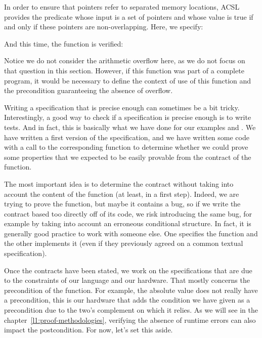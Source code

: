 In order to ensure that pointers refer to separated memory locations,
ACSL provides the predicate
 whose input is
a set of pointers and whose value is true if and only if these pointers are
non-overlapping. Here, we specify:






And this time, the function is verified:





Notice we do not consider the arithmetic overflow here, as
we do not focus on that question in this section. However, if this
function was part of a complete program, it would be necessary to define
the context of use of this function and the precondition guaranteeing
the absence of overflow.




Writing a specification that is precise enough can sometimes be a bit tricky.
Interestingly, a good way to check if a specification is precise enough is to
write tests. And in fact, this is basically what we have done for our examples
 and . We have written a first version of the
specification, and we have written some code with a call to the corresponding
function to determine whether we could prove some properties that we expected to
be easily provable from the contract of the function.



The most important
idea is to determine the contract without taking into account the content of the
function (at least, in a first step). Indeed, we are trying to prove the
function, but maybe it contains a bug, so if we write the contract based
too directly off of its code, we risk introducing the same bug, for
example by taking into account an erroneous conditional structure. In fact, it is
generally good practice to work with someone else. One specifies the function
and the other implements it (even if they previously agreed on a common textual
specification).



Once the contracts have been stated, we work on the specifications that are due
to the constraints of our language and our hardware. That mostly concerns the
precondition of the function. For example, the absolute value does not really
have a precondition, this is our hardware that adds the condition we have given
as a precondition due to the two's complement on which it relies. As we will see
in the chapter~\ref{l1:proof-methodologies}, verifying the absence of runtime
errors can also impact the postcondition. For now, let's set this aside.



